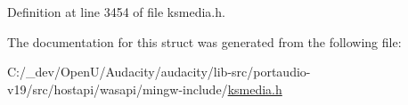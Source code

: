 Definition at line 3454 of file ksmedia.\+h.



The documentation for this struct was generated from the following file\+:\begin{DoxyCompactItemize}
\item 
C\+:/\+\_\+dev/\+Open\+U/\+Audacity/audacity/lib-\/src/portaudio-\/v19/src/hostapi/wasapi/mingw-\/include/\hyperlink{ksmedia_8h}{ksmedia.\+h}\end{DoxyCompactItemize}
